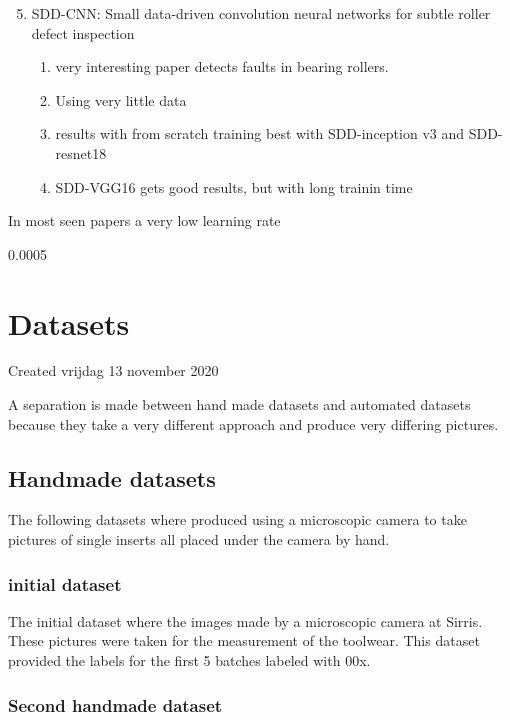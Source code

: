 \begin{enumerate}[1]
\setcounter{enumi}{4}
\item SDD-CNN: Small data-driven convolution neural networks for subtle roller defect inspection
	\begin{enumerate}[a]
	\item very interesting paper detects faults in bearing rollers. 
	\item Using very little data
	\item results with from scratch training best with SDD-inception v3 and SDD-resnet18
	\item SDD-VGG16 gets good results, but with long trainin time
	\end{enumerate}
\end{enumerate}


In most seen papers a very low learning rate 

0.0005 

\section{Datasets}

Created vrijdag 13 november 2020



A separation is made between hand made datasets and automated datasets because they take a very different approach and produce very differing pictures.



\subsection{Handmade datasets}

The following datasets where produced using a microscopic camera to take pictures of single inserts all placed under the camera by hand.



\subsubsection{initial dataset}

	The initial dataset where the images made by a microscopic camera at Sirris. These pictures were taken for the measurement of the toolwear. This dataset provided the labels for the first 5 batches labeled with 00x.
	


\subsubsection{Second handmade dataset}

